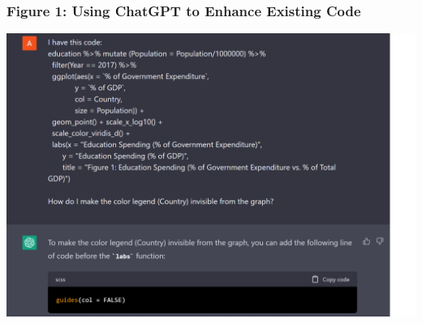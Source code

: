 \documentclass[
]{article}
\begin{document}
\hypertarget{figure-1-using-chatgpt-to-enhance-existing-code}{%
\subsubsection{Figure 1: Using ChatGPT to Enhance Existing Code}\label{figure-1-using-chatgpt-to-enhance-existing-code}}

\begin{center}\includegraphics[width=24in]{Images/figure1chatgpt} \end{center}
\end{document}
